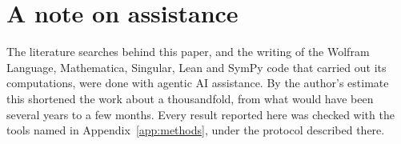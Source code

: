 \documentclass[a4paper,11pt]{article}
\numberwithin{equation}{section}
\theoremstyle{jsplain}
\theoremstyle{jsrem}
\begin{document}
\section*{A note on assistance}

The literature searches behind this paper, and the writing of the Wolfram Language, Mathematica, Singular, Lean and SymPy code that carried out its computations, were done with agentic AI assistance. By the author's estimate this shortened the work about a thousandfold, from what would have been several years to a few months. Every result reported here was checked with the tools named in Appendix~\ref{app:methods}, under the protocol described there.
\end{document}

